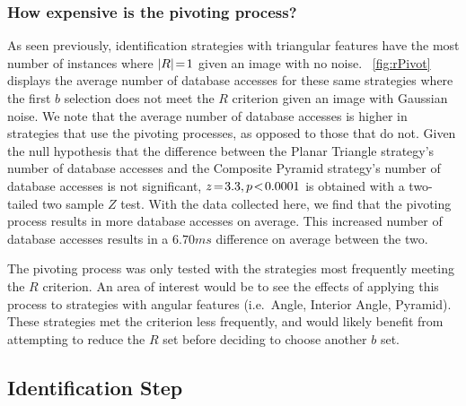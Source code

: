 \subsubsection{How expensive is the pivoting process?}
As seen previously, identification strategies with triangular features have the most number of instances where
$\left| R \right| \!=\! 1$ given an image with no noise.
~\autoref{fig:rPivot} displays the average number of database accesses for these same strategies where the first
$b$ selection does not meet the $R$ criterion given an image with Gaussian noise.
We note that the average number of database accesses is higher in strategies that use the pivoting processes,
as opposed to those that do not.
Given the null hypothesis that the difference between the Planar Triangle strategy's number of database accesses and
the Composite Pyramid strategy's number of database accesses is not significant, $z \!=\! 3.3, p\!<\!0.0001$ is
obtained with a two-tailed two sample $Z$ test.
With the data collected here, we find that the pivoting process results in more database accesses on average.
This increased number of database accesses results in a $6.70\si{ms}$ difference on average between the two.

The pivoting process was only tested with the strategies most frequently meeting the $R$ criterion.
An area of interest would be to see the effects of applying this process to strategies with angular features 
(i.e.\ Angle, Interior Angle, Pyramid).
These strategies met the criterion less frequently, and would likely benefit from attempting to reduce the $R$ set
before deciding to choose another $b$ set.

\subsection{Identification Step}\label{subsec:identificationStep}
\begin{figure}
\end{figure}

